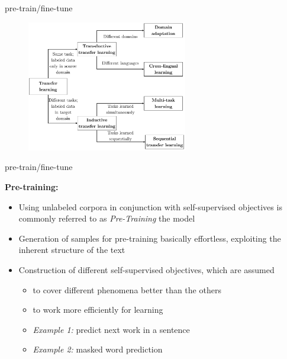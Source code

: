 
\begin{frame}{pre-train/fine-tune}

\vfill

\begin{figure}
	\centering
		\includegraphics[width = 7cm]{figure/transfer_learning_taxonomy-1.png}\\ 
\end{figure}

\vfill

\end{frame}


\begin{vbframe}{pre-train/fine-tune}

\vfill

\textbf{Pre-training:}

	\begin{itemize}
		\item Using unlabeled corpora in conjunction with self-supervised objectives 
					is commonly referred to as \textit{Pre-Training} the model
		\item Generation of samples for pre-training basically effortless, exploiting 
					the inherent structure of the text
		\item Construction of different self-supervised objectives, which are assumed
			\begin{itemize}
				\item to cover different phenomena better than the others
				\item to work more efficiently for learning
				\item \textit{Example 1:} predict next work in a sentence
				\item \textit{Example 2:} masked word prediction
			\end{itemize}
	\end{itemize}
	
\vfill

\end{vbframe}

